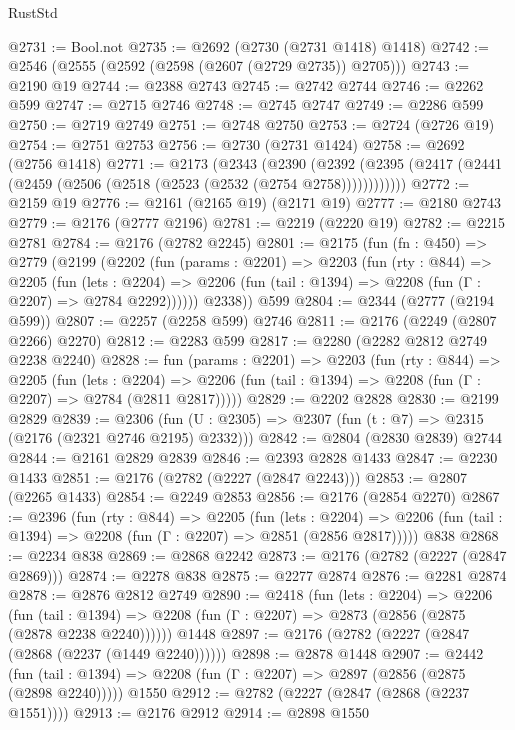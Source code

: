 \begin{lexlean}{RustStd}
\begin{coremodule}
@2731 := Bool.not
@2735 := @2692 (@2730 (@2731 @1418) @1418)
@2742 := @2546 (@2555 (@2592 (@2598 (@2607 (@2729 @2735)) @2705)))
@2743 := @2190 @19
@2744 := @2388 @2743
@2745 := @2742 @2744
@2746 := @2262 @599
@2747 := @2715 @2746
@2748 := @2745 @2747
@2749 := @2286 @599
@2750 := @2719 @2749
@2751 := @2748 @2750
@2753 := @2724 (@2726 @19)
@2754 := @2751 @2753
@2756 := @2730 (@2731 @1424)
@2758 := @2692 (@2756 @1418)
@2771 := @2173
    (@2343
      (@2390 (@2392 (@2395 (@2417 (@2441 (@2459 (@2506 (@2518 (@2523 (@2532 (@2754 @2758))))))))))))
@2772 := @2159 @19
@2776 := @2161 (@2165 @19) (@2171 @19)
@2777 := @2180 @2743
@2779 := @2176 (@2777 @2196)
@2781 := @2219 (@2220 @19)
@2782 := @2215 @2781
@2784 := @2176 (@2782 @2245)
@2801 := @2175
    (fun (fn : @450) =>
    @2779
      (@2199
        (@2202
          (fun (params : @2201) =>
          @2203
            (fun (rty : @844) =>
            @2205
              (fun (lets : @2204) =>
              @2206 (fun (tail : @1394) => @2208 (fun (Γ : @2207) => @2784 @2292))))))
        @2338))
    @599
@2804 := @2344 (@2777 (@2194 @599))
@2807 := @2257 (@2258 @599) @2746
@2811 := @2176 (@2249 (@2807 @2266) @2270)
@2812 := @2283 @599
@2817 := @2280 (@2282 @2812 @2749 @2238 @2240)
@2828 := fun (params : @2201) =>
  @2203
    (fun (rty : @844) =>
    @2205
      (fun (lets : @2204) =>
      @2206 (fun (tail : @1394) => @2208 (fun (Γ : @2207) => @2784 (@2811 @2817)))))
@2829 := @2202 @2828
@2830 := @2199 @2829
@2839 := @2306 (fun (U : @2305) => @2307 (fun (t : @7) => @2315 (@2176 (@2321 @2746 @2195) @2332)))
@2842 := @2804 (@2830 @2839) @2744
@2844 := @2161 @2829 @2839
@2846 := @2393 @2828 @1433
@2847 := @2230 @1433
@2851 := @2176 (@2782 (@2227 (@2847 @2243)))
@2853 := @2807 (@2265 @1433)
@2854 := @2249 @2853
@2856 := @2176 (@2854 @2270)
@2867 := @2396
    (fun (rty : @844) =>
    @2205
      (fun (lets : @2204) =>
      @2206 (fun (tail : @1394) => @2208 (fun (Γ : @2207) => @2851 (@2856 @2817)))))
    @838
@2868 := @2234 @838
@2869 := @2868 @2242
@2873 := @2176 (@2782 (@2227 (@2847 @2869)))
@2874 := @2278 @838
@2875 := @2277 @2874
@2876 := @2281 @2874
@2878 := @2876 @2812 @2749
@2890 := @2418
    (fun (lets : @2204) =>
    @2206
      (fun (tail : @1394) => @2208 (fun (Γ : @2207) => @2873 (@2856 (@2875 (@2878 @2238 @2240))))))
    @1448
@2897 := @2176 (@2782 (@2227 (@2847 (@2868 (@2237 (@1449 @2240))))))
@2898 := @2878 @1448
@2907 := @2442
    (fun (tail : @1394) => @2208 (fun (Γ : @2207) => @2897 (@2856 (@2875 (@2898 @2240)))))
    @1550
@2912 := @2782 (@2227 (@2847 (@2868 (@2237 @1551))))
@2913 := @2176 @2912
@2914 := @2898 @1550

\end{coremodule}
\end{lexlean}
